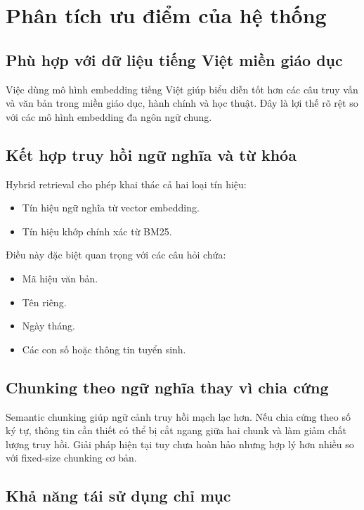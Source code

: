 \documentclass[12pt,a4paper]{article}
\begin{document}
\section{Phân tích ưu điểm của hệ thống}

\subsection{Phù hợp với dữ liệu tiếng Việt miền giáo dục}

Việc dùng mô hình embedding tiếng Việt giúp biểu diễn tốt hơn các câu truy vấn và văn bản trong miền giáo dục, hành chính và học thuật. Đây là lợi thế rõ rệt so với các mô hình embedding đa ngôn ngữ chung.

\subsection{Kết hợp truy hồi ngữ nghĩa và từ khóa}

Hybrid retrieval cho phép khai thác cả hai loại tín hiệu:
\begin{itemize}[leftmargin=1.5cm]
    \item Tín hiệu ngữ nghĩa từ vector embedding.
    \item Tín hiệu khớp chính xác từ BM25.
\end{itemize}

Điều này đặc biệt quan trọng với các câu hỏi chứa:
\begin{itemize}[leftmargin=1.5cm]
    \item Mã hiệu văn bản.
    \item Tên riêng.
    \item Ngày tháng.
    \item Các con số hoặc thông tin tuyển sinh.
\end{itemize}

\subsection{Chunking theo ngữ nghĩa thay vì chia cứng}

Semantic chunking giúp ngữ cảnh truy hồi mạch lạc hơn. Nếu chia cứng theo số ký tự, thông tin cần thiết có thể bị cắt ngang giữa hai chunk và làm giảm chất lượng truy hồi. Giải pháp hiện tại tuy chưa hoàn hảo nhưng hợp lý hơn nhiều so với fixed-size chunking cơ bản.

\subsection{Khả năng tái sử dụng chỉ mục}
\end{document}
